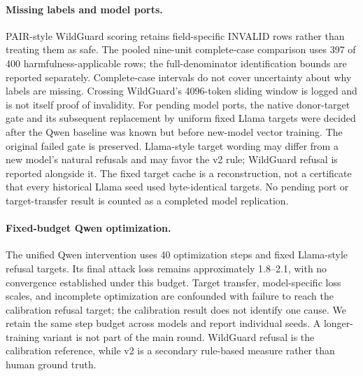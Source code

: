 \paragraph{Missing labels and model ports.}
PAIR-style WildGuard scoring retains field-specific INVALID rows rather than treating them as safe. The pooled nine-unit complete-case comparison uses 397 of 400 harmfulness-applicable rows; the full-denominator identification bounds are reported separately. Complete-case intervals do not cover uncertainty about why labels are missing. Crossing WildGuard's 4096-token sliding window is logged and is not itself proof of invalidity. For pending model ports, the native donor-target gate and its subsequent replacement by uniform fixed Llama targets were decided after the Qwen baseline was known but before new-model vector training. The original failed gate is preserved. Llama-style target wording may differ from a new model's natural refusals and may favor the v2 rule; WildGuard refusal is reported alongside it. The fixed target cache is a reconstruction, not a certificate that every historical Llama seed used byte-identical targets. No pending port or target-transfer result is counted as a completed model replication.

\paragraph{Fixed-budget Qwen optimization.}
The unified Qwen intervention uses 40 optimization steps and fixed Llama-style refusal targets. Its final attack loss remains approximately 1.8--2.1, with no convergence established under this budget. Target transfer, model-specific loss scales, and incomplete optimization are confounded with failure to reach the calibration refusal target; the calibration result does not identify one cause. We retain the same step budget across models and report individual seeds. A longer-training variant is not part of the main round. WildGuard refusal is the calibration reference, while v2 is a secondary rule-based measure rather than human ground truth.
